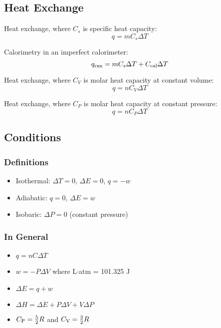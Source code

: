 \documentclass[10pt]{article}
\begin{document}
\subsection{Heat Exchange}

Heat exchange, where $C_s$ is specific heat capacity:
\begin{equation*}
q=mC_s\Delta T
\end{equation*}

Calorimetry in an imperfect calorimeter:
\begin{equation*}
q_\textnormal{rxn}=mC_s\Delta T + C_\textnormal{cal}\Delta T
\end{equation*}

Heat exchange, where $C_V$ is molar heat capacity at constant volume:
\begin{equation*}
q= nC_V\Delta T
\end{equation*}

Heat exchange, where $C_P$ is molar heat capacity at constant pressure:
\begin{equation*}
q= nC_P\Delta T
\end{equation*}


\subsection{Conditions}

\subsubsection{Definitions}
\begin{itemize}
    \item Isothermal: $\Delta T = 0$, $\Delta E = 0$, $q = -w$
    \item Adiabatic: $q = 0$, $\Delta E = w$
    \item Isobaric: $\Delta P = 0$ (constant pressure)
\end{itemize}

\subsubsection{In General}
\begin{itemize}
    \item $q = nC\Delta T$
    \item $w = -P\Delta V$ where L$\cdot$atm = 101.325 J
    \item $\Delta E = q + w$
    \item $\Delta H = \Delta E + P\Delta V + V\Delta P$
    \item $C_\textnormal{P} = \frac{5}{2}R$ and $C_\textnormal{V} = \frac{3}{2}R$
\end{itemize}
\end{document}
